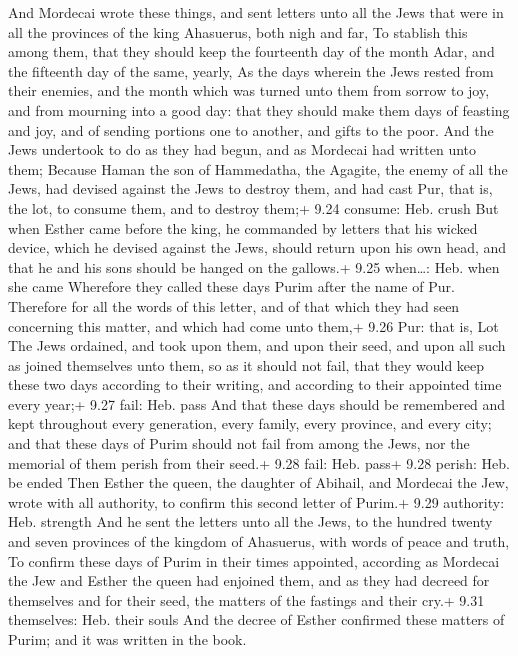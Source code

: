  And Mordecai wrote these things, and sent letters unto
all the Jews that were in all the provinces of the king Ahasuerus, both
nigh and far,  To stablish this among them, that they
should keep the fourteenth day of the month Adar, and the fifteenth day
of the same, yearly,  As the days wherein the Jews rested
from their enemies, and the month which was turned unto them from sorrow
to joy, and from mourning into a good day: that they should make them
days of feasting and joy, and of sending portions one to another, and
gifts to the poor.  And the Jews undertook to do as they
had begun, and as Mordecai had written unto them;  Because
Haman the son of Hammedatha, the Agagite, the enemy of all the Jews, had
devised against the Jews to destroy them, and had cast Pur, that is, the
lot, to consume them, and to destroy them;+ 9.24 consume: Heb. crush
 But when Esther came before the king, he commanded by
letters that his wicked device, which he devised against the Jews,
should return upon his own head, and that he and his sons should be
hanged on the gallows.+ 9.25 when\ldots: Heb. when she came
 Wherefore they called these days Purim after the name of
Pur. Therefore for all the words of this letter, and of that which they
had seen concerning this matter, and which had come unto them,+ 9.26
Pur: that is, Lot  The Jews ordained, and took upon them,
and upon their seed, and upon all such as joined themselves unto them,
so as it should not fail, that they would keep these two days according
to their writing, and according to their appointed time every year;+
9.27 fail: Heb. pass  And that these days should be
remembered and kept throughout every generation, every family, every
province, and every city; and that these days of Purim should not fail
from among the Jews, nor the memorial of them perish from their seed.+
9.28 fail: Heb. pass+ 9.28 perish: Heb. be ended  Then
Esther the queen, the daughter of Abihail, and Mordecai the Jew, wrote
with all authority, to confirm this second letter of Purim.+ 9.29
authority: Heb. strength  And he sent the letters unto all
the Jews, to the hundred twenty and seven provinces of the kingdom of
Ahasuerus, with words of peace and truth,  To confirm these
days of Purim in their times appointed, according as Mordecai the Jew
and Esther the queen had enjoined them, and as they had decreed for
themselves and for their seed, the matters of the fastings and their
cry.+ 9.31 themselves: Heb. their souls  And the decree of
Esther confirmed these matters of Purim; and it was written in the book.

